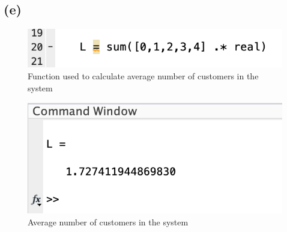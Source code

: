 \documentclass{article}
\begin{document}
\subsection{(e)}
\begin{figure}[H]
    \includegraphics[width=\linewidth]{./imgs/5ecode.png}
    \caption{Function used to calculate average number of customers in the system}
\end{figure}
\begin{figure}[H]
    \includegraphics[width=\linewidth]{./imgs/5eans.png}
    \caption{Average number of customers in the system}
\end{figure}
\end{document}
